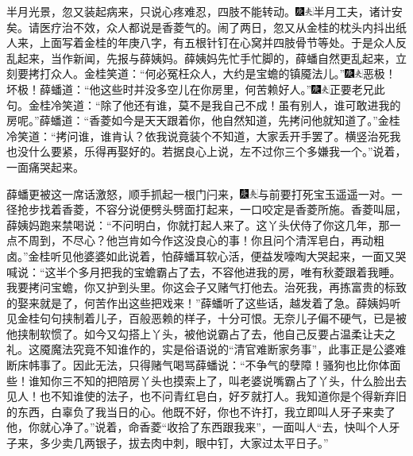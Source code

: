 半月光景，忽又装起病来，只说心疼难忍，四肢不能转动。{\includegraphics[width=3mm]{../Images/00004}\includegraphics[width=3mm]{../Images/00012}\footnotesize \kaishu 半月工夫，诸计安矣。}请医疗治不效，众人都说是香菱气的。闹了两日，忽又从金桂的枕头内抖出纸人来，上面写着金桂的年庚八字，有五根针钉在心窝并四肢骨节等处。于是众人反乱起来，当作新闻，先报与薛姨妈。薛姨妈先忙手忙脚的，薛蟠自然更乱起来，立刻要拷打众人。金桂笑道：“何必冤枉众人，大约是宝蟾的镇魇法儿。”{\includegraphics[width=3mm]{../Images/00004}\includegraphics[width=3mm]{../Images/00012}\footnotesize \kaishu 恶极！坏极！}薛蟠道：“他这些时并没多空儿在你房里，何苦赖好人。”{\includegraphics[width=3mm]{../Images/00004}\includegraphics[width=3mm]{../Images/00012}\footnotesize \kaishu 正要老兄此句。}金桂冷笑道：“除了他还有谁，莫不是我自己不成！虽有别人，谁可敢进我的房呢。”薛蟠道：“香菱如今是天天跟着你，他自然知道，先拷问他就知道了。”金桂冷笑道：“拷问谁，谁肯认？依我说竟装个不知道，大家丢开手罢了。横竖治死我也没什么要紧，乐得再娶好的。若据良心上说，左不过你三个多嫌我一个。”说着，一面痛哭起来。

薛蟠更被这一席话激怒，顺手抓起一根门闩来，{\includegraphics[width=3mm]{../Images/00004}\includegraphics[width=3mm]{../Images/00012}\footnotesize \kaishu 与前要打死宝玉遥遥一对。}一径抢步找着香菱，不容分说便劈头劈面打起来，一口咬定是香菱所施。香菱叫屈，薛姨妈跑来禁喝说：“不问明白，你就打起人来了。这丫头伏侍了你这几年，那一点不周到，不尽心？他岂肯如今作这没良心的事！你且问个清浑皂白，再动粗卤。”金桂听见他婆婆如此说着，怕薛蟠耳软心活，便益发嚎啕大哭起来，一面又哭喊说：“这半个多月把我的宝蟾霸占了去，不容他进我的房，唯有秋菱跟着我睡。我要拷问宝蟾，你又护到头里。你这会子又赌气打他去。治死我，再拣富贵的标致的娶来就是了，何苦作出这些把戏来！”薛蟠听了这些话，越发着了急。薛姨妈听见金桂句句挟制着儿子，百般恶赖的样子，十分可恨。无奈儿子偏不硬气，已是被他挟制软惯了。如今又勾搭上丫头，被他说霸占了去，他自己反要占温柔让夫之礼。这魇魔法究竟不知谁作的，实是俗语说的“清官难断家务事”，此事正是公婆难断床帏事了。因此无法，只得赌气喝骂薛蟠说：“不争气的孽障！骚狗也比你体面些！谁知你三不知的把陪房丫头也摸索上了，叫老婆说嘴霸占了丫头，什么脸出去见人！也不知谁使的法子，也不问青红皂白，好歹就打人。我知道你是个得新弃旧的东西，白辜负了我当日的心。他既不好，你也不许打，我立即叫人牙子来卖了他，你就心净了。”说着，命香菱“收拾了东西跟我来”，一面叫人“去，快叫个人牙子来，多少卖几两银子，拔去肉中刺，眼中钉，大家过太平日子。”

